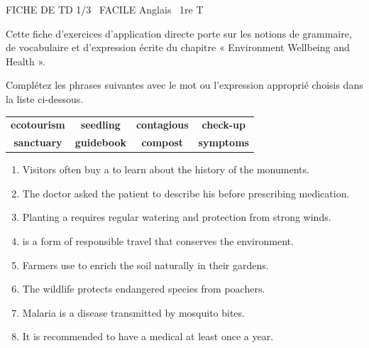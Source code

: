 \documentclass[11pt]{article}
\begin{document}
\begin{tcolorbox}[enhanced,colback=popink,colframe=popink,arc=10pt,boxrule=0pt,left=12pt,right=12pt,top=9pt,bottom=9pt]
{\color{white}\popxbold\small FICHE DE TD 1/3 \textbullet\ FACILE \hfill Anglais \textbullet\ 1re T\par}
\end{tcolorbox}
\vspace{4pt}
Cette fiche d'exercices d'application directe porte sur les notions de grammaire, de vocabulaire et d'expression écrite du chapitre « Environment Wellbeing and Health ».

\begin{exercice}
Complétez les phrases suivantes avec le mot ou l'expression approprié choisis dans la liste ci-dessous.
\begin{center}
\begin{tabular}{cccc}
\hline
\textbf{ecotourism} & \textbf{seedling} & \textbf{contagious} & \textbf{check-up} \\
\textbf{sanctuary} & \textbf{guidebook} & \textbf{compost} & \textbf{symptoms} \\
\hline
\end{tabular}
\end{center}
\begin{enumerate}
    \item Visitors often buy a \dotfill to learn about the history of the monuments.
    \item The doctor asked the patient to describe his \dotfill before prescribing medication.
    \item Planting a \dotfill requires regular watering and protection from strong winds.
    \item \dotfill is a form of responsible travel that conserves the environment.
    \item Farmers use \dotfill to enrich the soil naturally in their gardens.
    \item The wildlife \dotfill protects endangered species from poachers.
    \item Malaria is a \dotfill disease transmitted by mosquito bites.
    \item It is recommended to have a medical \dotfill at least once a year.
\end{enumerate}
\end{exercice}
\end{document}
